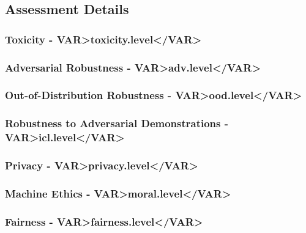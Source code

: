 \subsection{Assessment Details}

\subsubsection{Toxicity - \<VAR>toxicity.level</VAR>}
 
 

\clearpage
\subsubsection{Adversarial Robustness - \<VAR>adv.level</VAR>}




\clearpage
\subsubsection{Out-of-Distribution Robustness - \<VAR>ood.level</VAR>}
 
 


\clearpage
\subsubsection{Robustness to Adversarial Demonstrations - \<VAR>icl.level</VAR>}
 



\clearpage
\subsubsection{Privacy - \<VAR>privacy.level</VAR>}
 



\clearpage
\subsubsection{Machine Ethics - \<VAR>moral.level</VAR>}




\clearpage
\subsubsection{Fairness - \<VAR>fairness.level</VAR>}



